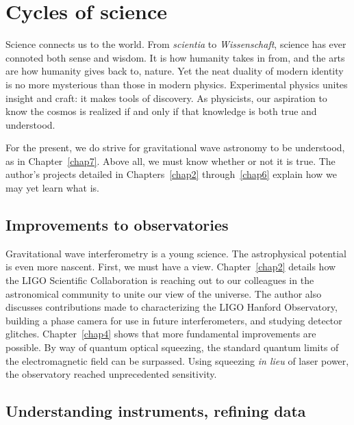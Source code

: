 


 
    \section{Cycles of science}
    \label{cycles}


Science connects us to the world. 
From \textit{scientia} to \textit{Wissenschaft}, science has ever connoted both sense and wisdom.
It is how humanity takes in from, and the arts are how humanity gives back to, nature.
Yet the neat duality of modern identity is no more mysterious than those in modern physics.
Experimental physics unites insight and craft: it makes tools of discovery.
As physicists, our aspiration to know the cosmos is realized if and only if that knowledge is both true and understood.

For the present, we do strive for gravitational wave astronomy to be understood, as in Chapter~\ref{chap7}.
Above all, we must know whether or not it is true.
The author's projects detailed in Chapters~\ref{chap2} through~\ref{chap6} explain how we may yet learn what is.

        \subsection{Improvements to observatories}
        \label{observatories_better}

Gravitational wave interferometry is a young science.
The astrophysical potential is even more nascent.
First, we must have a view. 
Chapter~\ref{chap2} details how the LIGO Scientific Collaboration is reaching out to our colleagues in the astronomical community to unite our view of the universe.
The author also discusses contributions made to characterizing the LIGO Hanford Observatory, building a phase camera for use in future interferometers, and studying detector glitches.
Chapter~\ref{chap4} shows that more fundamental improvements are possible.
By way of quantum optical squeezing, the standard quantum limits of the electromagnetic field can be surpassed.
Using squeezing \textit{in lieu} of laser power, the observatory reached unprecedented sensitivity.

        \subsection{Understanding instruments, refining data}
        \label{instrumental_understanding_data_refinements}

